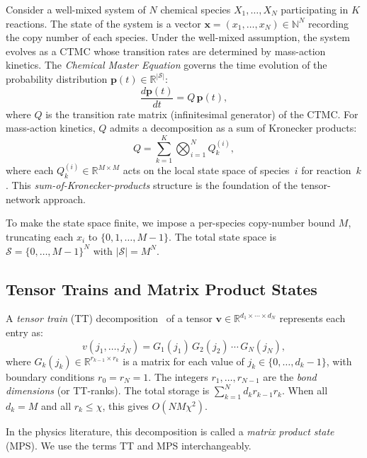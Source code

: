 \documentclass[11pt]{article}
\newcommand{\R}{\mathbb{R}}
\newcommand{\N}{\mathbb{N}}
\newcommand{\calS}{\mathcal{S}}
\begin{document}
Consider a well-mixed system of $N$ chemical species
$X_1, \ldots, X_N$ participating in $K$ reactions.
The state of the system is a vector
$\mathbf{x} = (x_1, \ldots, x_N) \in \N^N$
recording the copy number of each species.
Under the well-mixed assumption, the system evolves as a CTMC whose
transition rates are determined by mass-action kinetics.
The \emph{Chemical Master Equation} governs the time evolution of
the probability distribution $\mathbf{p}(t) \in \R^{|\calS|}$:
\begin{equation}\label{eq:cme}
  \frac{d\mathbf{p}(t)}{dt} = Q\,\mathbf{p}(t),
\end{equation}
where $Q$ is the transition rate matrix (infinitesimal generator)
of the CTMC.
For mass-action kinetics, $Q$ admits a decomposition as a sum of
Kronecker products:
\begin{equation}\label{eq:kron}
  Q = \sum_{k=1}^{K} \bigotimes_{i=1}^{N} Q_k^{(i)},
\end{equation}
where each $Q_k^{(i)} \in \R^{M \times M}$ acts on the local state
space of species~$i$ for reaction~$k$.
This \emph{sum-of-Kronecker-products} structure is the foundation
of the tensor-network approach.

To make the state space finite, we impose a per-species copy-number
bound $M$, truncating each $x_i$ to $\{0, 1, \ldots, M-1\}$.
The total state space is $\calS = \{0,\ldots,M-1\}^N$ with $|\calS| = M^N$.

\subsection{Tensor Trains and Matrix Product States}\label{sec:bg:tt}

A \emph{tensor train} (TT) decomposition~\cite{oseledets2011} of a
tensor $\mathbf{v} \in \R^{d_1 \times \cdots \times d_N}$ represents
each entry as:
\begin{equation}\label{eq:tt}
  v(j_1, \ldots, j_N)
  = G_1(j_1)\, G_2(j_2)\, \cdots\, G_N(j_N),
\end{equation}
where $G_k(j_k) \in \R^{r_{k-1} \times r_k}$ is a matrix for each
value of $j_k \in \{0, \ldots, d_k - 1\}$, with boundary conditions
$r_0 = r_N = 1$.
The integers $r_1, \ldots, r_{N-1}$ are the \emph{bond dimensions}
(or TT-ranks).
The total storage is $\sum_{k=1}^{N} d_k r_{k-1} r_k$.
When all $d_k = M$ and all $r_k \leq \chi$, this gives $O(NM\chi^2)$.

In the physics literature, this decomposition is called a
\emph{matrix product state} (MPS).
We use the terms TT and MPS interchangeably.
\end{document}
